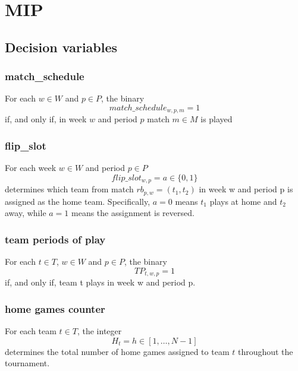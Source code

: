 \section{MIP}
\subsection{Decision variables}
\subsubsection{match\_schedule}
For each $w \in W$ and $p \in P$, the binary
$$
match\_schedule_{w,p,m} = 1
$$
if, and only if, in week $w$ and period $p$ match $m \in M$ is played 

\subsubsection{flip\_slot}
For each week $w \in W$ and period $p \in P$  
$$  
flip\_slot_{w,p} = a \in \{0, 1\}  
$$  
determines which team from match $rb_{p, w} = (t_1, t_2)$ in week w and period p is assigned as the home team. Specifically, $a = 0$ means $t_1$ plays at home and $t_2$ away, while $a = 1$ means the assignment is reversed.

\subsubsection{team periods of play}
For each $t \in T$, $w \in W$ and $p \in P$, the binary
$$
TP_{t,w,p} = 1
$$
if, and only if, team t plays in week w and period p.

\subsubsection{home games counter}
For each team $t \in T$, the integer  
$$  
H_t = h \in [1, \dots, N-1]
$$  
determines the total number of home games assigned to team $t$ throughout the tournament.

